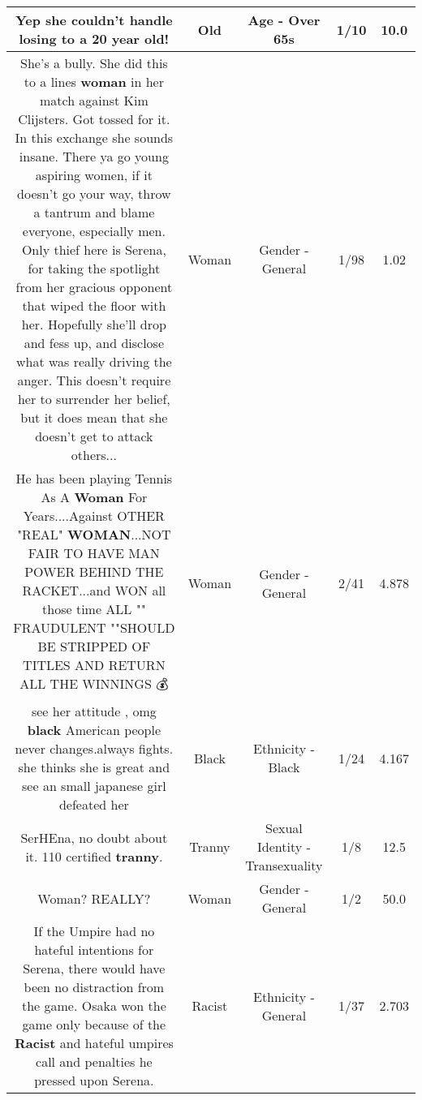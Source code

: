 \documentclass[11pt]{article}
\newlength\mylength
\begin{document}
\begin{center}
\begin{longtable}{|C{.65\mylength}|C{.30\mylength}|C{.12\mylength}|C{.12\mylength}|C{.12\mylength}|}
  \small Yep she couldn't handle losing to a 20 year \textbf{old}!\normalsize   & Old & Age - Over 65s & 1/10 & 10.0 \\  \hline
  \small She's a bully. She did this to a lines \textbf{woman} in her match against Kim Clijsters. Got tossed for it. In this exchange she sounds insane. There ya go young aspiring women, if it doesn't go your way, throw a tantrum and blame everyone, especially men. Only thief here is Serena, for taking the spotlight from her gracious opponent that wiped the floor with her. Hopefully she'll drop and fess up, and disclose what was really driving the anger. This doesn't require her to surrender her belief, but it does mean that she doesn't get to attack others...\normalsize   & Woman & Gender - General & 1/98 & 1.02 \\  \hline
  \small He has been playing Tennis As A \textbf{Woman} For Years....Against OTHER "REAL" \textbf{WOMAN}...NOT FAIR TO HAVE MAN POWER BEHIND THE RACKET...and WON all those time ALL "" FRAUDULENT ""SHOULD BE STRIPPED OF TITLES AND RETURN ALL THE WINNINGS 💰\normalsize   & Woman & Gender - General & 2/41 & 4.878 \\  \hline
  \small see her attitude , omg \textbf{black} American  people never changes.always fights. she thinks she is great and see an small japanese girl defeated her\normalsize   & Black & Ethnicity - Black & 1/24 & 4.167 \\  \hline
  \small SerHEna, no doubt about it. 110 certified \textbf{tranny}.\normalsize   & Tranny & Sexual Identity - Transexuality & 1/8 & 12.5 \\  \hline
  \small Woman? REALLY?\normalsize   & Woman & Gender - General & 1/2 & 50.0 \\  \hline
  \small If the Umpire had no hateful intentions for Serena, there would have been no distraction from the game.  Osaka won the game only because of the \textbf{Racist} and hateful umpires call and penalties he pressed upon Serena.\normalsize   & Racist & Ethnicity - General & 1/37 & 2.703 \\  \hline

\end{longtable}
\end{center}
\end{document}
